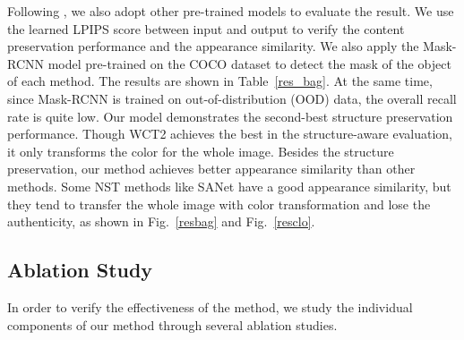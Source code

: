 Following \cite{tumanyan2022splicing}, we also adopt other pre-trained models to evaluate the result.
We use the learned LPIPS score between input and output to verify the content preservation performance and the appearance similarity. We also apply the Mask-RCNN model pre-trained on the COCO dataset to detect the mask of the object of each method. The results are shown in Table~\ref{res_bag}. At the same time, since Mask-RCNN is trained on out-of-distribution (OOD) data, the overall recall rate is quite low. Our model demonstrates the second-best structure preservation performance. Though WCT2 achieves the best in the structure-aware evaluation, it only transforms the color for the whole image. Besides the structure preservation, our method achieves better appearance similarity than other methods. Some NST methods like SANet have a good appearance similarity, but they tend to transfer the whole image with color transformation and lose the authenticity, as shown in Fig.~\ref{resbag} and Fig.~\ref{resclo}.




\subsection{Ablation Study}

In order to verify the effectiveness of the method, we study the individual components of our method through several ablation studies.

